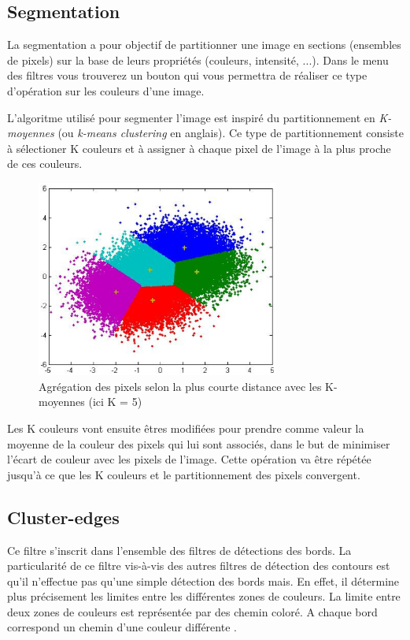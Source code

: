 \documentclass[twoside,openright,a4paper,11pt,french]{article}
\begin{document}
\subsection{Segmentation}
La segmentation a pour objectif de partitionner une image en sections
(ensembles de pixels) sur la base de leurs propriétés (couleurs,
intensité, ...). Dans le menu des filtres vous trouverez un bouton qui
vous permettra de réaliser ce type d'opération sur les couleurs
d'une image.

L'algoritme utilisé pour segmenter l'image est inspiré du
partitionnement en {\it K-moyennes} (ou {\it k-means clustering} en
anglais). Ce type de partitionnement consiste à sélectioner K couleurs
et à assigner à chaque pixel de l'image à la plus proche de ces couleurs.

\begin{figure}[h]
\centering
\includegraphics[width=8cm]{./pics/kmeans.eps}
\caption{Agrégation des pixels selon la plus courte distance avec les
K-moyennes (ici K = 5)}
\label{fig:routcidr}
\end{figure}

Les K couleurs vont ensuite êtres modifiées pour prendre comme valeur la
moyenne de la couleur des pixels qui lui sont associés, dans le but de
minimiser l'écart de couleur avec les pixels de l'image. Cette opération va
être répétée jusqu'à ce que les K couleurs et le partitionnement des pixels
convergent. 

\subsection{Cluster-edges}
Ce filtre s'inscrit dans l'ensemble des filtres de détections des
bords. La particularité de ce filtre vis-à-vis des autres filtres de
détection des contours est qu'il n'effectue pas qu'une simple détection
des bords mais. En effet, il détermine plus précisement les limites entre les
différentes zones de couleurs. 
La limite entre deux zones de couleurs est représentée par des
chemin coloré. A chaque bord correspond un chemin d'une couleur
différente \cite{url-novelvect}.
\end{document}
